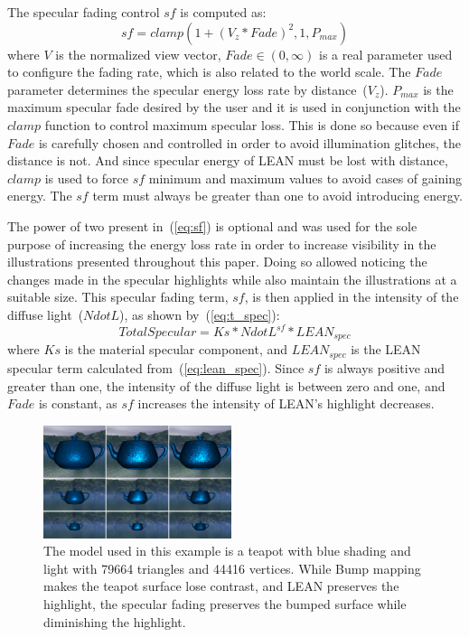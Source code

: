 \documentclass[10pt, conference]{IEEEtran}
\begin{document}
The specular fading control $sf$ is computed as:
\begin{equation}
	\label{eq:sf}
	sf = clamp(1 + (V_{z} * Fade)^{2}, 1, P_{max})
\end{equation}
where $V$ is the normalized view vector, \mbox{$Fade \in (0, \infty)$} is a real parameter used to configure the fading rate, which is also related to the world scale. The $Fade$ parameter determines the specular energy loss rate by distance~($V_{z}$). $P_{max}$ is the maximum specular fade desired by the user and it is used in conjunction with the $clamp$ function to control maximum specular loss. This is done so because even if $Fade$ is carefully chosen and controlled in order to avoid illumination glitches, the distance is not. And since specular energy of LEAN must be lost with distance, $clamp$ is used to force $sf$ minimum and maximum values to avoid cases of gaining energy. The $sf$ term must always be greater than one to avoid introducing energy.

The power of two present in~(\ref{eq:sf}) is optional and was used for the sole purpose of increasing the energy loss rate in order to increase visibility in the illustrations presented throughout this paper. Doing so allowed noticing the changes made in the specular highlights while also maintain the illustrations at a suitable size. This specular fading term, $sf$, is then applied in the intensity of the diffuse light~($NdotL$), as shown by~(\ref{eq:t_spec}):
\begin{equation}
	\label{eq:t_spec}
	TotalSpecular = Ks * NdotL^{sf} * LEAN_{spec}
\end{equation}
where $Ks$ is the material specular component, and $LEAN_{spec}$ is the LEAN specular term calculated from~(\ref{eq:lean_spec}). Since $sf$ is always positive and greater than one, the intensity of the diffuse light is between zero and one, and $Fade$ is constant, as $sf$ increases the intensity of LEAN's highlight decreases.


\begin{figure}[!t]
	\includegraphics[width=0.49\textwidth]{figs/teapot1.png}
	\caption{The model used in this example is a teapot with blue shading and light with 79664 triangles and 44416 vertices. While Bump mapping makes the teapot surface lose contrast, and LEAN preserves the highlight, the specular fading preserves the bumped surface while diminishing the highlight.}
	\label{fig:teapot1}
\end{figure}
\end{document}
